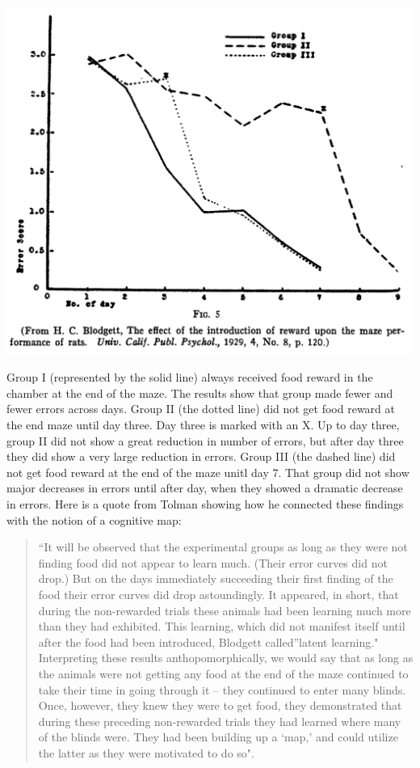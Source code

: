 \documentclass[
  oneside,
  12pt]{crumpbook}
\newenvironment{floatrightbox50}{%
  \wrapfigure{R}{.5\textwidth}%
  }{%
  \endwrapfigure}
\begin{document}
\begin{floatrightbox50}
\includegraphics[width=1\linewidth]{imgs/Tolman_latentresults}

\end{floatrightbox50}

Group I (represented by the solid line) always received food reward in the chamber at the end of the maze. The results show that group made fewer and fewer errors across days. Group II (the dotted line) did not get food reward at the end maze until day three. Day three is marked with an X. Up to day three, group II did not show a great reduction in number of errors, but after day three they did show a very large reduction in errors. Group III (the dashed line) did not get food reward at the end of the maze unitl day 7. That group did not show major decreases in errors until after day, when they showed a dramatic decrease in errors. Here is a quote from Tolman showing how he connected these findings with the notion of a cognitive map:

\begin{quote}
``It will be observed that the experimental groups as long as they were not finding food did not appear to learn much. (Their error curves did not drop.) But on the days immediately succeeding their first finding of the food their error curves did drop astoundingly. It appeared, in short, that during the non-rewarded trials these animals had been learning much more than they had exhibited. This learning, which did not manifest itself until after the food had been introduced, Blodgett called''latent learning." Interpreting these results anthopomorphically, we would say that as long as the animals were not getting any food at the end of the maze continued to take their time in going through it -- they continued to enter many blinds. Once, however, they knew they were to get food, they demonstrated that during these preceding non-rewarded trials they had learned where many of the blinds were. They had been building up a `map,' and could utilize the latter as they were motivated to do so".
\end{quote}
\end{document}
